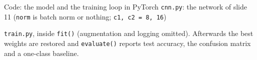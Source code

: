 \documentclass[aspectratio=169,10pt]{beamer}
\begin{document}
\begin{frame}[fragile]{Code: the model and the training loop in PyTorch}
\vspace{-1mm}
{\footnotesize \texttt{cnn.py}: the network of slide 11 (\texttt{norm} is batch norm or nothing; \texttt{c1, c2 = 8, 16})}

\vspace{0.3mm}
{\footnotesize \texttt{train.py}, inside \texttt{fit()} (augmentation and logging omitted). Afterwards the best weights are
restored and \texttt{evaluate()} reports test accuracy, the confusion matrix and a one-class baseline.}

\end{frame}
\end{document}
